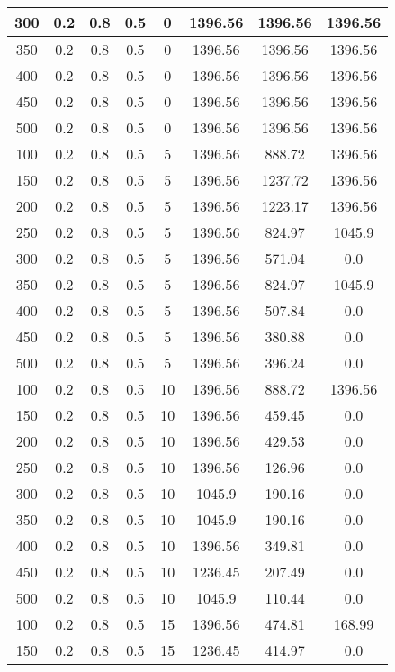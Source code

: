 \documentclass[a4paper, 12pt]{extreport}
\begin{document}
\begin{itemize}
\begin{longtable}{|c|c|c|c|c|c|c|c|}
			300 & 0.2 & 0.8 & 0.5 & 0 & 1396.56 & 1396.56 & 1396.56 \\\hline
			350 & 0.2 & 0.8 & 0.5 & 0 & 1396.56 & 1396.56 & 1396.56 \\\hline
			400 & 0.2 & 0.8 & 0.5 & 0 & 1396.56 & 1396.56 & 1396.56 \\\hline
			450 & 0.2 & 0.8 & 0.5 & 0 & 1396.56 & 1396.56 & 1396.56 \\\hline
			500 & 0.2 & 0.8 & 0.5 & 0 & 1396.56 & 1396.56 & 1396.56 \\\hline
			100 & 0.2 & 0.8 & 0.5 & 5 & 1396.56 & 888.72 & 1396.56 \\\hline
			150 & 0.2 & 0.8 & 0.5 & 5 & 1396.56 & 1237.72 & 1396.56 \\\hline
			200 & 0.2 & 0.8 & 0.5 & 5 & 1396.56 & 1223.17 & 1396.56 \\\hline
			250 & 0.2 & 0.8 & 0.5 & 5 & 1396.56 & 824.97 & 1045.9 \\\hline
			300 & 0.2 & 0.8 & 0.5 & 5 & 1396.56 & 571.04 & 0.0 \\\hline
			350 & 0.2 & 0.8 & 0.5 & 5 & 1396.56 & 824.97 & 1045.9 \\\hline
			400 & 0.2 & 0.8 & 0.5 & 5 & 1396.56 & 507.84 & 0.0 \\\hline
			450 & 0.2 & 0.8 & 0.5 & 5 & 1396.56 & 380.88 & 0.0 \\\hline
			500 & 0.2 & 0.8 & 0.5 & 5 & 1396.56 & 396.24 & 0.0 \\\hline
			100 & 0.2 & 0.8 & 0.5 & 10 & 1396.56 & 888.72 & 1396.56 \\\hline
			150 & 0.2 & 0.8 & 0.5 & 10 & 1396.56 & 459.45 & 0.0 \\\hline
			200 & 0.2 & 0.8 & 0.5 & 10 & 1396.56 & 429.53 & 0.0 \\\hline
			250 & 0.2 & 0.8 & 0.5 & 10 & 1396.56 & 126.96 & 0.0 \\\hline
			300 & 0.2 & 0.8 & 0.5 & 10 & 1045.9 & 190.16 & 0.0 \\\hline
			350 & 0.2 & 0.8 & 0.5 & 10 & 1045.9 & 190.16 & 0.0 \\\hline
			400 & 0.2 & 0.8 & 0.5 & 10 & 1396.56 & 349.81 & 0.0 \\\hline
			450 & 0.2 & 0.8 & 0.5 & 10 & 1236.45 & 207.49 & 0.0 \\\hline
			500 & 0.2 & 0.8 & 0.5 & 10 & 1045.9 & 110.44 & 0.0 \\\hline
			100 & 0.2 & 0.8 & 0.5 & 15 & 1396.56 & 474.81 & 168.99 \\\hline
			150 & 0.2 & 0.8 & 0.5 & 15 & 1236.45 & 414.97 & 0.0 \\\hline

\end{longtable}
\end{itemize}
\end{document}
